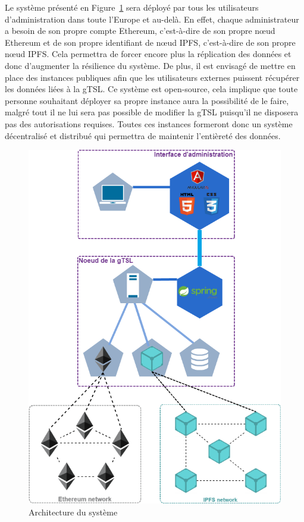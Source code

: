 \documentclass{tnreport}
\begin{document}
Le système présenté en Figure~\ref{fig:architecture} sera déployé par tous les utilisateurs d'administration dans toute l'Europe et au-delà. En effet, chaque administrateur a besoin de son propre compte Ethereum, c'est-à-dire de son propre nœud Ethereum et de son propre identifiant de nœud IPFS, c'est-à-dire de son propre nœud IPFS. Cela permettra de forcer encore plus la réplication des données et donc d'augmenter la résilience du système. De plus, il est envisagé de mettre en place des instances publiques afin que les utilisateurs externes puissent récupérer les données liées à la gTSL. Ce système est open-source, cela implique que toute personne souhaitant déployer sa propre instance aura la possibilité de le faire, malgré tout il ne lui sera pas possible de modifier la gTSL puisqu'il ne disposera pas des autorisations requises. Toutes ces instances formeront donc un système décentralisé et distribué qui permettra de maintenir l'entièreté des données. 

\begin{figure}[h]
	\centering
	\includegraphics[scale=0.75]{figures/architecture}
	\caption{Architecture du système}
	\label{fig:architecture}
\end{figure}
\clearpage
\end{document}

